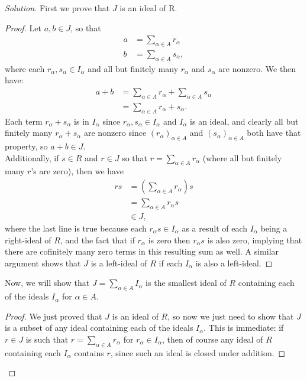\documentclass[12pt]{article}
\newenvironment{solution}
  {\renewcommand\qedsymbol{$\blacksquare$}\begin{proof}[Solution]}
{\end{proof}}
\newenvironment{sproof}{
  \renewcommand\qedsymbol{$\square$}
  \begin{proof}
  }{
  \end{proof}
}
\theoremstyle{remark}
\begin{document}
\begin{solution}
  First we prove that $J$ is an ideal of R. 
  \begin{sproof}
    Let $a,b\in J$, so that
    \begin{align*}
      a &= \sum_{\alpha\in A} r_\alpha \\
      b &= \sum_{\alpha\in A} s_\alpha,
    \end{align*}
    where each $r_\alpha,s_\alpha\in I_\alpha$ and all but finitely many $r_\alpha$ and $s_\alpha$
    are nonzero.
    We then have:
    \begin{align*}
      a+b &= \sum_{\alpha\in A} r_\alpha + \sum_{\alpha\in A} s_\alpha \\
      &= \sum_{\alpha\in A} r_\alpha+s_\alpha.
    \end{align*}
    Each term $r_\alpha+s_\alpha$ is in $I_\alpha$ since $r_\alpha,s_\alpha\in I_\alpha$ and
    $I_\alpha$ is an ideal, and clearly all but finitely many $r_\alpha+s_\alpha$ are nonzero
    since $(r_\alpha)_{\alpha\in A}$ and $(s_\alpha)_{\alpha\in A}$ both have that property, so
    $a+b\in J$.\\
    \indent Additionally, if $s\in R$ and $r\in J$ so that $r=\sum_{\alpha\in A}r_\alpha$ 
    (where all but finitely many $r$'s are zero),
    then we have
    \begin{align*}
      rs &= \left( \sum_{\alpha\in A} r_\alpha \right)s\\
      &= \sum_{\alpha\in A} r_\alpha s \\
      &\in J,
    \end{align*}
    where the last line is true because each $r_\alpha s\in I_\alpha$ as a result of each $I_\alpha$
    being a right-ideal of $R$, and the fact that if $r_\alpha$ is zero then $r_\alpha s$ is also zero, 
    implying that there are cofinitely many zero terms in this resulting sum as well.
    A similar argument shows that $J$ is a left-ideal of $R$ if each $I_\alpha$ is also a left-ideal.
  \end{sproof}

  Now, we will show that $J=\sum_{\alpha\in A} I_{\alpha}$ is the smallest ideal of $R$ containing
  each of the ideals $I_\alpha$ for $\alpha\in A$.
  \begin{sproof}
    We just proved that $J$ is an ideal of $R$, so now we just need to show that $J$ is a subset
    of any ideal containing each of the ideals $I_\alpha$.
    This is immediate: if $r\in J$ is such that $r=\sum_{\alpha\in A} r_\alpha$ for 
    $r_\alpha\in I_\alpha$, then of course any ideal of $R$ containing each $I_\alpha$
    contains $r$, since such an ideal is closed under addition.
  \end{sproof}
\end{solution}
\end{document}
